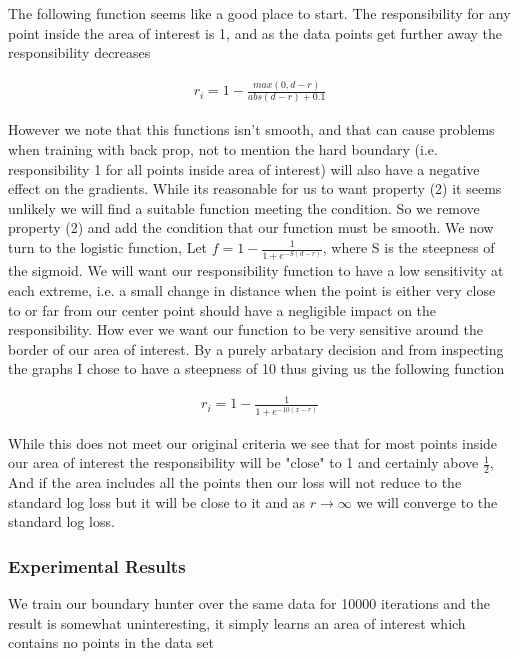 \documentclass{article}
\theoremstyle{definition}
\begin{document}
The following function seems like a good place to start. The responsibility for any point inside the area of interest is 1, and as the data points get further away the responsibility decreases

\begin{align}
r_i = 1 - \frac{max(0, d-r)}{abs(d-r) + 0.1}
\end{align}

However we note that this functions isn't smooth, and that can cause problems when training with back prop, not to mention the hard boundary (i.e. responsibility 1 for all points inside area of interest) will also have a negative effect on the gradients. While its reasonable for us to want property (2) it seems unlikely we will find a suitable function meeting the condition. So we remove property (2) and add the condition that our function must be smooth. We now turn to the logistic function, Let $f = 1 - \frac{1}{1 + e^{-S(d - r)}}$, where S is the steepness of the sigmoid. We will want our responsibility function to have a low sensitivity at each extreme, i.e. a small change in distance when the point is either very close to or far from our center point should have a negligible impact on the responsibility. How ever we want our function to be very sensitive around the border of our area of interest. By a purely arbatary decision and from inspecting the graphs I chose to have a steepness of 10 thus giving us the following function

\begin{align}
r_i = 1 - \frac{1}{1 + e^{-10(x-r)}}
\end{align}

While this does not meet our original criteria we see that for most points inside our area of interest the responsibility will be "close" to 1 and certainly above $\frac{1}{2}$, And if the area includes all the points then our loss will not reduce to the standard log loss but it will be close to it and as $r \to\infty$ we will converge to the standard log loss.

\subsubsection{Experimental Results}
We train our boundary hunter over the same data for 10000 iterations and the result is somewhat uninteresting, it simply learns an area of interest which contains no points in the data set
\end{document}
